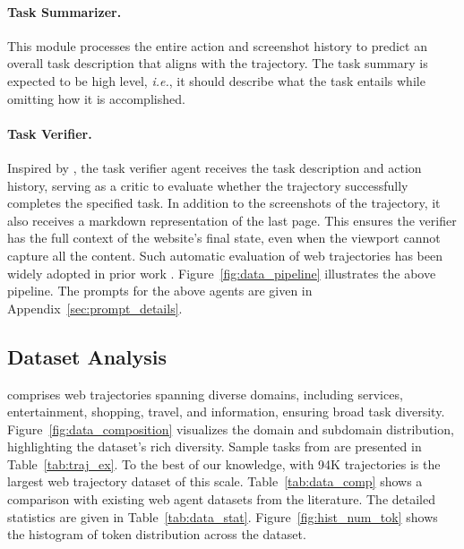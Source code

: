 \paragraph{Task Summarizer.}
This module processes the entire action and screenshot history to predict an overall task description that aligns with the trajectory.
The task summary is expected to be high level, \textit{i.e.}, it should describe what the task entails while omitting how it is accomplished.

\paragraph{Task Verifier.}\label{sec:verifier}
Inspired by \citet{DBLP:journals/corr/abs-2404-06474}, the task verifier agent receives the task description and action history, serving as a critic to evaluate whether the trajectory successfully completes the specified task.
In addition to the screenshots of the trajectory, it also receives a markdown representation of the last page.
This ensures the verifier has the full context of the website's final state, even when the viewport cannot capture all the content.
Such automatic evaluation of web trajectories has been widely adopted in prior work \cite{xu2024agenttrek, DBLP:conf/acl/HeYM0D0L024, koh2024tree}. 
Figure~\ref{fig:data_pipeline} illustrates the above pipeline.
The prompts for the above agents are given in Appendix~\ref{sec:prompt_details}. 






\subsection{Dataset Analysis}


\model comprises web trajectories spanning diverse domains, including services, entertainment, shopping, travel, and information, ensuring broad task diversity.
Figure~\ref{fig:data_composition} visualizes the domain and subdomain distribution, highlighting the dataset's rich diversity.
Sample tasks from \model are presented in Table~\ref{tab:traj_ex}.
To the best of our knowledge, \model with 94K trajectories is the largest web trajectory dataset of this scale.
Table~\ref{tab:data_comp} shows a comparison with existing web agent datasets from the literature.
The detailed statistics are given in Table~\ref{tab:data_stat}. 
Figure~\ref{fig:hist_num_tok} shows the histogram of token distribution across the dataset.

